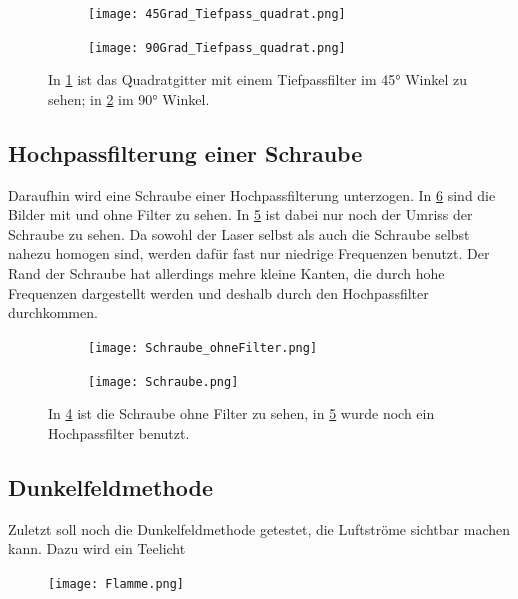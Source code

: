 \begin{figure}[h]
	\begin{subfigure}[c]{0.5\textwidth}
		
		\texttt{[image: 45Grad\_Tiefpass\_quadrat.png]}
		\caption{}
		\label{fig:45Gitter}
		
	\end{subfigure}
	\begin{subfigure}[c]{0.5\textwidth}
		\texttt{[image: 90Grad\_Tiefpass\_quadrat.png]}
		\caption{}
		\label{fig:90Gitter}
	\end{subfigure}
	\caption{In \cref{fig:45Gitter} ist das Quadratgitter mit einem Tiefpassfilter im 45° Winkel zu sehen; in \cref{fig:90Gitter} im 90° Winkel.}
	\label{blabla}
\end{figure}  




\subsection{Hochpassfilterung einer Schraube}
Daraufhin wird eine Schraube einer Hochpassfilterung unterzogen. In \cref{Schraube} sind die Bilder mit und ohne Filter zu sehen. In \cref{fig:Schraube_Filter} ist dabei nur noch der Umriss der Schraube zu sehen. Da sowohl der Laser selbst als auch die Schraube selbst nahezu homogen sind, werden dafür fast nur niedrige Frequenzen benutzt. Der Rand der Schraube hat allerdings mehre kleine Kanten, die durch hohe Frequenzen dargestellt werden und deshalb durch den Hochpassfilter durchkommen.

\begin{figure}[h]
	\begin{subfigure}[c]{0.5\textwidth}
		
		\texttt{[image: Schraube\_ohneFilter.png]}
		\caption{}
		\label{fig:Schraube}
		
	\end{subfigure}
	\begin{subfigure}[c]{0.5\textwidth}
		\texttt{[image: Schraube.png]}
		\caption{}
		\label{fig:Schraube_Filter}
	\end{subfigure}
	\caption{In \cref{fig:Schraube} ist die Schraube ohne Filter zu sehen, in \cref{fig:Schraube_Filter} wurde noch ein Hochpassfilter benutzt.}
	\label{Schraube}
\end{figure}  

\subsection{Dunkelfeldmethode}
Zuletzt soll noch die Dunkelfeldmethode getestet, die Luftströme sichtbar machen kann. Dazu wird ein Teelicht 

\begin{figure}[h!]
	\centering
	\texttt{[image: Flamme.png]}
	\caption{}
	\label{Flamme}
\end{figure}
